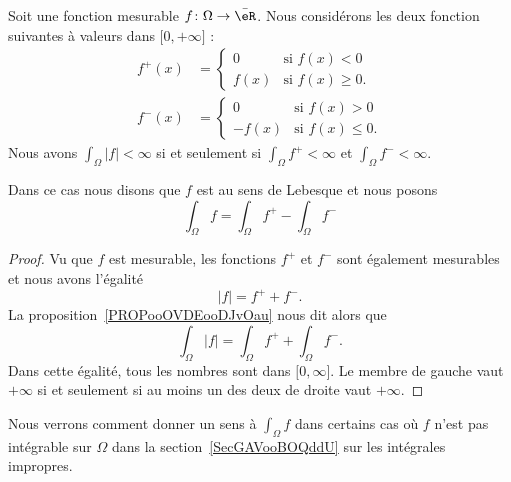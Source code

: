 \begin{propositionDef}  \label{DefTCXooAstMYl}
    Soit une fonction mesurable \( f\colon \Omega\to  \bar \eR \). Nous considérons les deux fonction suivantes à valeurs dans \( \mathopen[ 0 , +\infty \mathclose]\) :
    \begin{subequations}
        \begin{align}
            f^+(x)&=\begin{cases}
                0    &   \text{si } f(x)<0\\
                f(x)    &    \text{si } f(x)\geq 0.
            \end{cases}\\
            f^-(x)&=\begin{cases}
                0    &   \text{si } f(x)>0\\
                -f(x)    &    \text{si } f(x)\leq 0.
            \end{cases}
        \end{align}
    \end{subequations}
    Nous avons \( \int_{\Omega}| f |<\infty\) si et seulement si \( \int_{\Omega} f^+<\infty  \) et \( \int_{\Omega}f^-<\infty\).

    Dans ce cas nous disons que \( f\) est  au sens de Lebesque et nous posons
    \begin{equation}    \label{EqUHSooWfgUty}
        \int_{\Omega}f=\int_{\Omega}f^+-\int_{\Omega}f^-
    \end{equation}
\end{propositionDef}

\begin{proof}
    Vu que \( f\) est mesurable, les fonctions \( f^+\) et \( f^-\) sont également mesurables et nous avons l'égalité
    \begin{equation}
        | f |=f^++f^-.
    \end{equation}
    La proposition~\ref{PROPooOVDEooDJvOau} nous dit alors que
    \begin{equation}
        \int_{\Omega} | f |=\int_{\Omega}f^++\int_{\Omega}f^-.
    \end{equation}
    Dans cette égalité, tous les nombres sont dans \( \mathopen[ 0 , \infty \mathclose]\). Le membre de gauche vaut \( +\infty\) si et seulement si au moins un des deux de droite vaut \( +\infty\).
\end{proof}

Nous verrons comment donner un sens à \( \int_{\Omega}f\) dans certains cas où \( f\) n'est pas intégrable sur \( \Omega\) dans la section~\ref{SecGAVooBOQddU} sur les intégrales impropres.

